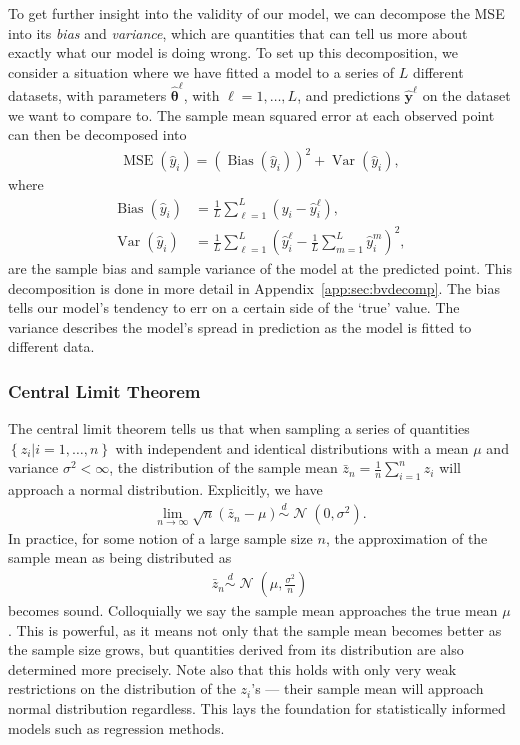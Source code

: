 \documentclass[twocolumn,english,notitlepage]{article}
\renewcommand{\vec}[1]{\boldsymbol{#1}}
\newcommand{\pclosed}[1]{\left(#1\right)}
\newcommand{\cclosed}[1]{\left\{#1\right\}}
\newcommand{\normal}[2]{\operatorname{\mathcal{N}}\pclosed{#1,#2}}
\newcommand{\distas}{\overset{d}{\sim}}
\DeclareMathOperator{\mse}{MSE}
\renewcommand{\var}{\operatorname{Var}}
\newcommand{\bias}{\operatorname{Bias}}
\begin{document}
        To get further insight into the validity of our model, we can decompose the MSE into its \textit{bias} and \textit{variance}, which are quantities that can tell us more about exactly what our model is doing wrong. To set up this decomposition, we consider a situation where we have fitted a model to a series of $L$ different datasets, with parameters $\vec{\hat{\theta}}^\ell$, with $\ell=1,\ldots,L$, and predictions $\vec{\hat{y}}^\ell$ on the dataset we want to compare to. The sample mean squared error at each observed point can then be decomposed into
        \begin{align}
            \mse(\hat{y}_i) = \pclosed{\bias(\hat{y}_i)}^2 + \var(\hat{y}_i),
        \end{align}
        where 
        \begin{subequations}
            \begin{align}
                \bias(\hat{y}_i) &= \frac{1}{L}\sum_{\ell=1}^L \pclosed{y_i - \hat{y}_i^\ell}, \\
                \var(\hat{y}_i) &= \frac{1}{L}\sum_{\ell=1}^L \pclosed{\hat{y}_i^\ell - \frac{1}{L} \sum_{m=1}^L \hat{y}_i^m }^2,
            \end{align}
            \label{theo:eq:bias and var}
        \end{subequations}
        are the sample bias and sample variance of the model at the predicted point. This decomposition is done in more detail in Appendix~\ref{app:sec:bvdecomp}. The bias tells our model's tendency to err on a certain side of the `true' value. The variance describes the model's spread in prediction as the model is fitted to different data.


    \subsubsection{Central Limit Theorem}
        The central limit theorem tells us that when sampling a series of quantities $\cclosed{z_i|i=1,\ldots,n}$ with independent and identical distributions with a mean $\mu$ and variance $\sigma^2<\infty$, the distribution of the sample mean $\bar{z}_n = \frac{1}{n}\sum_{i=1}^n z_i$ will approach a normal distribution. Explicitly, we have
        \begin{align}\label{theo:eq:CLM}
            \lim_{n\to\infty} \sqrt{n}(\bar{z}_n-\mu) \distas \normal{0}{\sigma^2}.
        \end{align}
        In practice, for some notion of a large sample size $n$, the approximation of the sample mean as being distributed as
        \begin{align}
            \bar{z}_n \distas \normal{\mu}{\frac{\sigma^2}{n}}
        \end{align}
        becomes sound. Colloquially we say the sample mean approaches the true mean $\mu$. This is powerful, as it means not only that the sample mean becomes better as the sample size grows, but quantities derived from its distribution are also determined more precisely. Note also that this holds with only very weak restrictions on the distribution of the $z_i$'s --- their sample mean will approach normal distribution regardless. This lays the foundation for statistically informed models such as regression methods.
\end{document}
